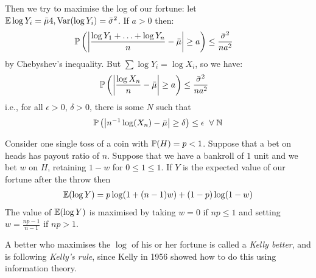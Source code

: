 \documentclass[10pt,a4paper]{article}
\begin{document}
Then we try to maximise the log of our fortune: let $\E\log Y_i = \bar{\mu}4, \Var(\log Y_i) = \bar{\sigma}^2$. If $a > 0$ then:
\begin{align*}
\P\left(\left| \frac{\log Y_1+\ldots + \log Y_n}{n} - \bar{\mu}\right|\geq a\right) & \leq \frac{\bar{\sigma}^2}{na^2}
\end{align*}
by Chebyshev's inequality. But $\sum \log Y_i = \log X_i$, so we have:
\begin{align*}
\P\left(\left| \frac{\log X_n}{n} - \bar{\mu}\right|\geq a\right) & \leq \frac{\bar{\sigma}^2}{na^2}
\end{align*}
i.e., for all $\epsilon > 0$, $\delta > 0$, there is some $N$ such that
\begin{align*}
\P\left(\left| n^{-1}\log(X_n) - \bar{\mu}\right| \geq \delta\right) \leq \epsilon\;\;\forall\;\N
\end{align*}
\begin{lemma}
Consider one single toss of a coin with $\P(H) = p < 1$. Suppose that a bet on heads has payout ratio of $n$. Suppose that we have a bankroll of $1$ unit and we bet $w$ on $H$, retaining $1-w$ for $0\leq 1 \leq 1$. If $Y$ is the expected value of our fortune after the throw then
\begin{align*}
\E(\log Y) = p\log(1+(n-1)w) + (1-p)\log(1-w)
\end{align*}
The value of $\E(\log Y)$ is maximised by taking $w = 0$ if $np \leq 1$ and setting $w = \frac{np-1}{n-1}$ if $np > 1$.
\end{lemma}
A better who maximises the $\log$ of his or her fortune is called a \emph{Kelly better}, and is following \emph{Kelly's rule}, since Kelly in 1956 showed how to do this using information theory.
\end{document}
